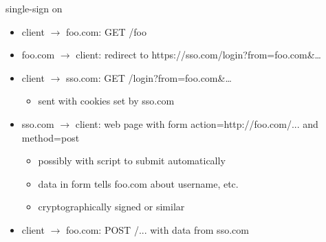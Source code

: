 \begin{frame}{single-sign on}
\begin{itemize}
\item client $\rightarrow$ foo.com: GET /foo
\item foo.com $\rightarrow$ client: redirect to https://sso.com/login?from=foo.com\&\ldots
\item client $\rightarrow$ sso.com: GET /login?from=foo.com\&\ldots
    \begin{itemize}
    \item sent with cookies set by sso.com
    \end{itemize}
\item sso.com $\rightarrow$ client: web page with form action=http://foo.com/... and method=post
    \begin{itemize}
    \item possibly with script to submit automatically
    \item data in form tells foo.com about username, etc.
    \item cryptographically signed or similar
    \end{itemize}
\item client $\rightarrow$ foo.com: POST /... with data from sso.com
\end{itemize}
\end{frame}
